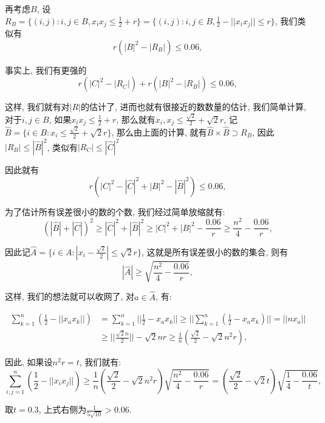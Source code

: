 \documentclass[lang=cn,12pt,thmcnt=section]{elegantbook}
\begin{document}
\begin{analysis}
再考虑$B$, 设$R_B=\{(i,j):i,j\in B,x_ix_j\le \frac{1}{2}+r\}=\{(i,j):i,j\in B,\frac{1}{2}-||x_ix_j||\le r\}$, 我们类似有
\[
r(|B|^2-|R_B|)\le 0.06,
\]

事实上, 我们有更强的
\[
r(|C|^2-|R_C|)+r(|B|^2-|R_B|)\le 0.06,
\]

这样, 我们就有对$|R|$的估计了, 进而也就有很接近的数数量的估计, 我们简单计算, 对于$i,j\in B$, 如果$x_ix_j\le \frac{1}{2}+r$, 那么就有$x_i,x_j\le \frac{\sqrt{2}}{2}+\sqrt{2}r$, 记$\hat{B}=\{i\in B:x_i\le \frac{\sqrt{2}}{2}+\sqrt{2}r\}$, 那么由上面的计算, 就有$\hat{B}\times \hat{B}\supset R_B$, 因此$|R_B|\le |\hat{B}|^2$, 类似有$|R_C|\le |\hat{C}|^2$

因此就有
\[
r(|C|^2-|\hat{C}|^2+|B|^2- |\hat{B}|^2)\le 0.06,
\]

为了估计所有误差很小的数的个数, 我们经过简单放缩就有: 
\[
(|\hat{B}|+|\hat{C}|)^2\ge |\hat{C}|^2+|\hat{B}|^2\ge |C|^2+|B|^2-\frac{0.06}{r}\ge \frac{n^2}{4}-\frac{0.06}{r},
\]

因此记$\hat{A}=\{i\in A:|x_i-\frac{\sqrt{2}}{2}|\le \sqrt{2}r\}$, 这就是所有误差很小的数的集合, 则有
\[|\hat{A}|\ge \sqrt{\frac{n^2}{4}-\frac{0.06}{r}},\]

这样, 我们的想法就可以收网了, 对$a\in \hat{A}$, 有:

\begin{align*}
	\sum_{k=1}^n \left(\frac{1}{2}-||x_ax_k||\right)&=\sum_{k=1}^n ||\frac{1}{2}-x_ax_k||\ge ||\sum_{k=1}^n \left(\frac{1}{2}-x_ax_k\right)||=||nx_a||\\
	&\ge ||\frac{\sqrt{2}n}{2}||-\sqrt{2}nr\ge \frac{1}{n}\left(\frac{\sqrt{2}}{2}-\sqrt{2}n^2r\right),
\end{align*}

因此, 如果设$n^2r=t$, 我们就有: 
\[
\sum_{i,j=1}^n \left(\frac{1}{2}-||x_ix_j||\right)\ge \frac{1}{n}\left(\frac{\sqrt{2}}{2}-\sqrt{2}n^2r\right)\sqrt{\frac{n^2}{4}-\frac{0.06}{r}}=\left(\frac{\sqrt{2}}{2}-\sqrt{2}t\right)\sqrt{\frac{1}{4}-\frac{0.06}{t}},
\]

取$t=0.3$, 上式右侧为$\frac{1}{5\sqrt{10}}>0.06$.



\end{analysis}
\end{document}

